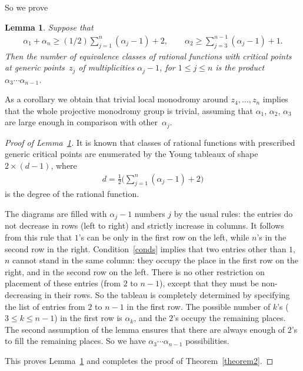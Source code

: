 \documentclass[11pt]{article}
\numberwithin{equation}{section}
\newtheorem{lem}[thm]{Lemma}
 { \theoremstyle{definition}
\newtheorem{Remark}[thm]{Remark} }
\def\lc{,\allowbreak\ldots,\allowbreak}
\begin{document}
So we prove

\begin{lem}\label{lem2}
Suppose that
\begin{gather}\label{conds}
\alpha_1+\alpha_n\geq (1/2)\sum_{j=1}^n(\alpha_j-1)+2,\qquad \alpha_2\geq\sum_{j=3}^{n-1}(\alpha_j-1)+1.
\end{gather}
Then the number of equivalence classes of rational functions with critical points at generic points~$z_j$ of multiplicities $\alpha_j-1$, for $1\leq j\leq n$ is the product $\alpha_3\cdots\alpha_{n-1}$.
\end{lem}

As a corollary we obtain that trivial local monodromy around $z_4\lc z_n$ implies that the whole projective monodromy group is trivial, assuming that $\alpha_1$, $\alpha_2$, $\alpha_3$ are large enough in comparison with
other~$\alpha_j$.

\begin{proof}[Proof of Lemma~\ref{lem2}]It is known \cite{EGSV} that classes of rational functions with prescribed generic critical points are enumerated by the Young tableaux of shape $2\times (d-1)$, where
\begin{gather*}
d=\frac12 \biggl(\sum_{j=1}^n(\alpha_j-1)+2\biggr)
\end{gather*}
is the degree of the rational function.

The diagrams are filled with $\alpha_j-1$ numbers $j$ by the usual rules: the entries do not decrease in rows (left to right) and strictly increase in columns. It follows from this rule that $1$'s can be only in the first row on the left, while $n$'s in the second row in the right. Condition~\eqref{conds} implies that two entries other than $1$, $n$ cannot stand in the same column: they occupy the place in the first row on the right, and in the second row on the left. There is no other restriction on placement of these entries (from $2$ to $n-1$), except that they must be non-decreasing in their rows. So the tableau is completely determined by specifying the list of entries from $2$ to $n-1$ in the first row. The possible number of $k$'s ($3\leq k\leq n-1$) in the first row is $\alpha_k$, and the $2$'s occupy the remaining places. The second assumption of the lemma ensures that there are always enough of $2$'s to fill the remaining places. So we have $\alpha_3\cdots\alpha_{n-1}$ possibilities.

This proves Lemma~\ref{lem2} and completes the proof of Theorem~\ref{theorem2}.
\end{proof}
\end{document}
